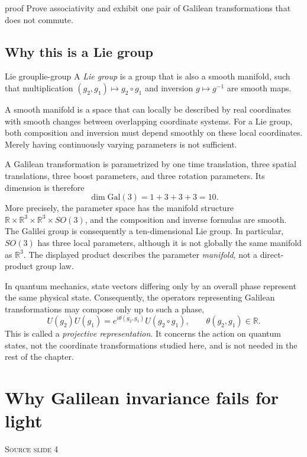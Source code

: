 \documentclass[11pt,a4paper]{article}
\newcommand{\R}{\mathbb{R}}
\newcommand{\slideref}[1]{%
  \par\smallskip
  {\footnotesize\color{ink!60}\textsc{Source slide #1}}\par
}
\begin{document}
\begin{studentwork}[height=9.0cm]{proof}
Prove associativity and exhibit one pair of Galilean transformations that does
not commute.
\end{studentwork}

\subsection{Why this is a Lie group}

\begin{definition}{Lie group}{lie-group}
A \emph{Lie group} is a group that is also a smooth manifold, such that
multiplication \((g_2,g_1)\mapsto g_2\circ g_1\) and inversion
\(g\mapsto g^{-1}\) are smooth maps.
\end{definition}

A smooth manifold is a space that can locally be described by real coordinates
with smooth changes between overlapping coordinate systems. For a Lie group,
both composition and inversion must depend smoothly on these local
coordinates. Merely having continuously varying parameters is not sufficient.

A Galilean transformation is parametrized by one time translation, three
spatial translations, three boost parameters, and three rotation parameters.
Its dimension is
therefore
\[
  \dim \mathrm{Gal}(3)=1+3+3+3=10.
\]
More precisely, the parameter space has the manifold structure
\(\R\times\R^3\times\R^3\times SO(3)\), and the composition and inverse
formulas are smooth. The Galilei group is consequently a ten-dimensional Lie
group. In particular, \(SO(3)\) has three local parameters, although it is not
globally the same manifold as \(\R^3\). The displayed product describes the
parameter \emph{manifold}, not a direct-product group law.

\begin{precision}
In quantum mechanics, state vectors differing only by an overall phase
represent the same physical state. Consequently, the operators representing
Galilean transformations may compose only up to such a phase,
\[
  U(g_2)U(g_1)
  =e^{i\theta(g_2,g_1)}U(g_2\circ g_1),\qquad \theta(g_2,g_1)\in\R.
\]
This is called a \emph{projective representation}. It concerns the action on
quantum states, not the coordinate transformations studied here, and is not
needed in the rest of the chapter.
\end{precision}

\section{Why Galilean invariance fails for light}
\slideref{4}
\end{document}
